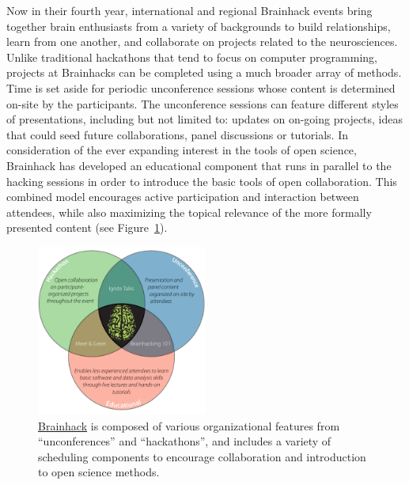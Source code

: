 \documentclass[11pt]{bmc_article_s50}
\begin{document}
Now in their fourth year, international and regional Brainhack events bring together brain enthusiasts from a variety of backgrounds to build relationships, learn from one another, and collaborate on projects related to the neurosciences. Unlike traditional hackathons that tend to focus on computer programming, projects at Brainhacks can be completed using a much broader array of methods. Time is set aside for periodic unconference sessions whose content is determined on-site by the participants. The unconference sessions can feature different styles of presentations, including but not limited to: updates on on-going projects, ideas that could seed future collaborations, panel discussions or tutorials. In consideration of the ever expanding interest in the tools of open science, Brainhack has developed an educational component that runs in parallel to the hacking sessions in order to introduce the basic tools of open collaboration. This combined model encourages active participation and interaction between attendees, while also maximizing the topical relevance of the more formally presented content (see Figure~\ref{fig1}).

\begin{figure}[htp]
\begin{center}
  \includegraphics[width=0.5\textwidth]{Figure_01}
  \caption{\href{http://www.brainhack.org}{Brainhack} is composed of various organizational features from ``unconferences'' and ``hackathons'', and includes a variety of scheduling components to encourage collaboration and introduction to open science methods.}
  \label{fig1}
\end{center}
\end{figure}
\end{document}
